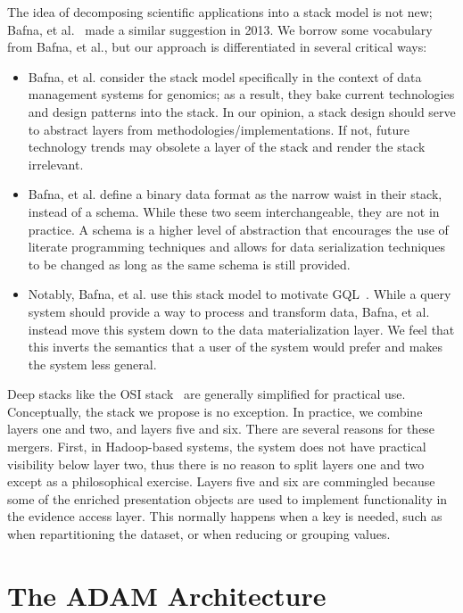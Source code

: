 \documentclass[phd]{ucbthesis}
\begin{document}
The idea of decomposing scientific applications into a stack model is not new; Bafna, et al.~\cite{bafna13}
made a similar suggestion in 2013. We borrow some vocabulary from Bafna, et al., but our approach is
differentiated in several critical ways:

\begin{itemize}
\item Bafna, et al. consider the stack model specifically in the context of data management systems for
genomics; as a result, they bake current technologies and design patterns into the stack. In our opinion,
a stack design should serve to abstract layers from methodologies/implementations. If not, future
technology trends may obsolete a layer of the stack and render the stack irrelevant.
\item Bafna, et al. define a binary data format as the narrow waist in their stack, instead of a schema.
While these two seem interchangeable, they are not in practice. A schema is a higher level of abstraction
that encourages the use of literate programming techniques and allows for data serialization techniques
to be changed as long as the same schema is still provided.
\item Notably, Bafna, et al. use this stack model to motivate GQL~\cite{kozanitis14}. While a query system
should provide a way to process and transform data, Bafna, et al. instead move this system down to the
data materialization layer. We feel that this inverts the semantics that a user of the system would prefer
and makes the system less general.
\end{itemize}

Deep stacks like the OSI stack~\cite{zimmermann80} are generally simplified for practical use. Conceptually,
the stack we propose is no exception. In practice, we combine layers one and two, and layers five and six.
There are several reasons for these mergers. First, in {Hadoop}-based systems, the system does not have practical visibility
below layer two, thus there is no reason to split layers one and two except as a philosophical exercise.
Layers five and six are commingled because some of the enriched presentation objects are used to
implement functionality in the evidence access layer. This normally happens when a key is needed, such as
when repartitioning the dataset, or when reducing or grouping values.

\chapter{The {ADAM} Architecture}
\label{chap:architecture}
\end{document}
